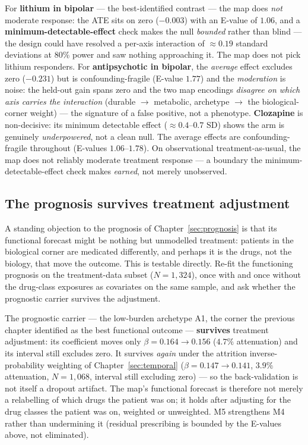\begin{keyresult}
For \textbf{lithium in bipolar} --- the best-identified contrast --- the map does \emph{not} moderate response:
the ATE sits on zero ($-0.003$) with an E-value of $1.06$, and a \textbf{minimum-detectable-effect} check makes
the null \emph{bounded} rather than blind --- the design could have resolved a per-axis interaction of
$\approx 0.19$ standard deviations at 80\% power and saw nothing approaching it. The map does not pick lithium
responders. For \textbf{antipsychotic in bipolar}, the \emph{average} effect excludes zero ($-0.231$) but is
confounding-fragile (E-value $1.77$) and the \emph{moderation} is noise: the held-out gain spans zero and the
two map encodings \emph{disagree on which axis carries the interaction} (durable $\to$ metabolic, archetype
$\to$ the biological-corner weight) --- the signature of a false positive, not a phenotype. \textbf{Clozapine}
is non-decisive: its minimum detectable effect ($\approx 0.4$--$0.7$ SD) shows the arm is genuinely
\emph{underpowered}, not a clean null. The average effects are confounding-fragile throughout (E-values
$1.06$--$1.78$). On observational treatment-as-usual, the map does not reliably moderate treatment response ---
a boundary the minimum-detectable-effect check makes \emph{earned}, not merely unobserved.
\end{keyresult}

\subsection{The prognosis survives treatment adjustment}
\label{sub:m5survival}
A standing objection to the prognosis of Chapter~\ref{sec:prognosis} is that its functional forecast might be
nothing but unmodelled treatment: patients in the biological corner are medicated differently, and perhaps it is
the drugs, not the biology, that move the outcome. This is testable directly. Re-fit the functioning prognosis on
the treatment-data subset ($N=1{,}324$), once with and once without the drug-class exposures as covariates on the
same sample, and ask whether the prognostic carrier survives the adjustment.

\begin{keyresult}
The prognostic carrier --- the low-burden archetype A1, the corner the previous chapter identified as the best
functional outcome --- \textbf{survives} treatment adjustment: its coefficient moves only $\beta=0.164\to0.156$
($4.7\%$ attenuation) and its interval still excludes zero. It survives \emph{again} under the attrition
inverse-probability weighting of Chapter~\ref{sec:temporal} ($\beta=0.147\to0.141$, $3.9\%$ attenuation,
$N=1{,}068$, interval still excluding zero) --- so the back-validation is not itself a dropout artifact. The
map's functional forecast is therefore not merely a relabelling of which drugs the patient was on; it holds
after adjusting for the drug classes the patient was on, weighted or unweighted. M5 strengthens M4 rather than
undermining it (residual prescribing is bounded by the E-values above, not eliminated).
\end{keyresult}


